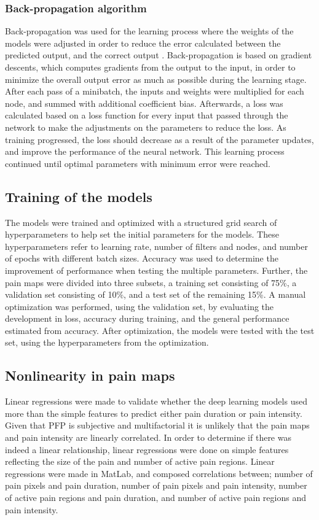 \subsubsection{Back-propagation algorithm}
Back-propagation was used for the learning process where the weights of the models were adjusted in order to reduce the error calculated between the predicted output, and the correct output \citep{Duda2000}. Back-propagation is based on gradient descents, which computes gradients from the output to the input, in order to minimize the overall output error as much as possible during the learning stage. 
After each pass of a minibatch, the inputs and weights were multiplied for each node, and summed with additional coefficient bias.\citep{LeCun1998, Hameed2016}
Afterwards, a loss was calculated based on a loss function for every input that passed through the network to make the adjustments on the parameters to reduce the loss. As training progressed, the loss should decrease as a result of the parameter updates, and improve the performance of the neural network.\citep{Goodfellow2016, LeCun2015, Duda2000} This learning process continued until optimal parameters with minimum error were reached.\citep{Hameed2016}

\vspace{-0.2cm}
\subsection{Training of the models}
The models were trained and optimized with a structured grid search of hyperparameters to help set the initial parameters for the models. These hyperparameters refer to learning rate, number of filters and nodes, and number of epochs with different batch sizes. Accuracy was used to determine the improvement of performance when testing the multiple parameters.
Further, the pain maps were divided into three subsets, a training set consisting of 75\%, a validation set consisting of 10\%, and a test set of the remaining 15\%. A manual optimization was performed, using the validation set, by evaluating the development in loss, accuracy during training, and the general performance estimated from accuracy. After optimization, the models were tested with the test set, using the hyperparameters from the optimization.
 
 
\subsection{Nonlinearity in pain maps} 
Linear regressions were made to validate whether the deep learning models used more than the simple features to predict either pain duration or pain intensity.
Given that PFP is subjective and multifactorial it is unlikely that the pain maps and pain intensity are linearly correlated. In order to determine if there was indeed a linear relationship, linear regressions were done on simple features reflecting the size of the pain and number of active pain regions. Linear regressions were made in MatLab, and composed correlations between; number of pain pixels and pain duration, number of pain pixels and pain intensity, number of active pain regions and pain duration, and number of active pain regions and pain intensity.

